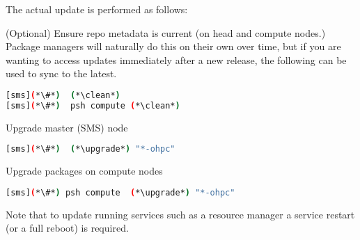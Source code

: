 The actual update is performed as follows:
\begin{enumerate*}
\item (Optional) Ensure repo metadata is current (on head and compute nodes.)
  Package managers will naturally do this on their own over time,
  but if you are wanting to access updates immediately after a new release,
  the following can be used to sync to the latest.

\begin{lstlisting}[language=bash,keywords={}]
[sms](*\#*)  (*\clean*)
[sms](*\#*)  psh compute (*\clean*)
\end{lstlisting}

\item Upgrade master (SMS) node

\begin{lstlisting}[language=bash,keywords={}]
[sms](*\#*)  (*\upgrade*) "*-ohpc"
\end{lstlisting}
  
\item Upgrade packages on compute nodes

\begin{lstlisting}[language=bash,keywords={}]
[sms](*\#*) psh compute  (*\upgrade*) "*-ohpc"
\end{lstlisting}
  

\end{enumerate*}

\noindent Note that to update running services such as a resource manager a
service restart (or a full reboot) is required.

